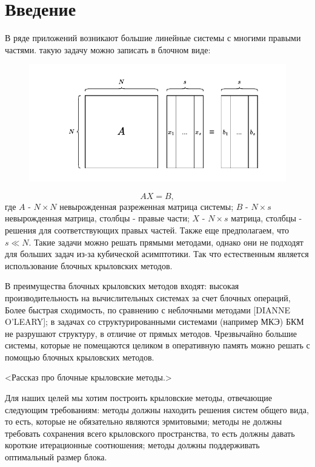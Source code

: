 \section{Введение}
\label{sec:Chapter0} 
В ряде приложений возникают большие линейные системы с многими правыми частями. такую задачу можно записать в блочном виде:\\
\begin{figure}[H]
    \centering
    \includegraphics[width=0.5\linewidth]{images/system.pdf}
    \label{fig:system}
\end{figure}
$$AX=B,$$
где $A$ - $N\times N$ невырожденная разреженная матрица системы;
$B$ - $N\times s$ невырожденная матрица, столбцы - правые части; 
$X$ - $N\times s$ матрица, столбцы - решения для соответствующих правых частей. 
Также еще предполагаем, что $s\ll N$.
Такие задачи можно решать прямыми методами, однако они не подходят для больших 
задач из-за кубической асимптотики. Так что естественным является использование 
блочных крыловских методов.\\

\par В преимущества блочных крыловских методов входят:
высокая производительность на вычислительных системах за счет блочных операций,
Более быстрая сходимость, по сравнению с неблочными методами [DIANNE O'LEARY]; 
в задачах со структурированными системами (например МКЭ) БКМ не разрушают структуру,
в отличие от прямых методов.
Чрезвычайно большие системы, которые не помещаются целиком в оперативную память 
можно решать с помощью блочных крыловских методов.\\
\par <Рассказ про блочные крыловские методы.>\\
\par Для наших целей мы хотим построить крыловские методы, отвечающие следующим требованиям: методы должны находить
решения систем общего вида, то есть, которые не обязательно являются эрмитовыми;
методы не должны требовать сохранения всего крыловского пространства, то есть должны 
давать короткие итерационные соотношения; 
методы должны поддерживать оптимальный размер блока.


\newpage

